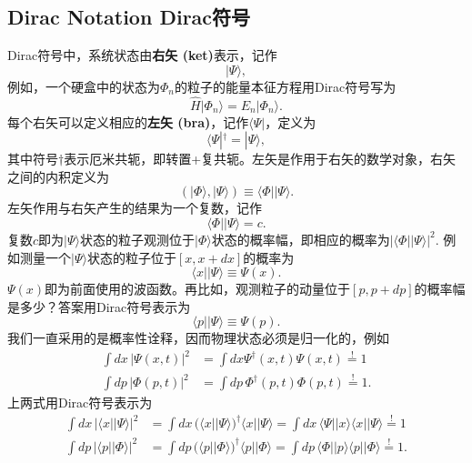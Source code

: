 \subsection[Dirac符号]{Dirac Notation \quad Dirac符号}\label{sec8.5.3}
Dirac符号中，系统状态由{\bf 右矢 (ket)}表示，记作
\begin{equation}
\label{equ8.34}
	|\Psi \rangle,
\end{equation}
例如，一个硬盒中的状态为$\Phi_n$的粒子的能量本征方程用Dirac符号写为
\[
	\hat{H} |\Phi_n \rangle = E_n |\Phi_n \rangle.
\]
每个右矢可以定义相应的{\bf 左矢 (bra)}，记作$\langle \Psi|$，定义为
\begin{equation}
\label{equ8.35}
	\langle \Psi|^\dag = |\Psi \rangle,
\end{equation}
其中符号$\dag$表示厄米共轭，即转置+复共轭。左矢是作用于右矢的数学对象，右矢之间的内积定义为
\[
	(|\Phi \rangle, |\Psi \rangle) \equiv \langle \Phi | | \Psi \rangle.
\]
左矢作用与右矢产生的结果为一个复数，记作
\begin{equation}
\label{equ8.36}
	\langle \Phi || \Psi \rangle = c.
\end{equation}
复数$c$即为$|\Psi \rangle$状态的粒子观测位于$|\Phi\rangle$状态的概率幅，即相应的概率为$| \langle \Phi || \Psi \rangle |^2$. 例如测量一个$|\Psi \rangle$状态的粒子位于$[x, x + dx]$的概率为
\[
	\langle x | | \Psi \rangle \equiv \Psi(x).
\]
$\Psi(x)$即为前面使用的波函数。再比如，观测粒子的动量位于$[p, p + dp]$的概率幅是多少？答案用Dirac符号表示为
\[
	\langle p || \Psi \rangle \equiv \Psi(p).
\]
我们一直采用的是概率性诠释，因而物理状态必须是归一化的，例如
\begin{align}
\label{equ8.37}
	\int dx\, |\Psi(x, t)|^2 &= \int dx \Psi^\dag(x, t) \Psi(x, t) \stackrel{!}{=} 1 \\
\label{equ8.38}
	\int dp\, |\Phi (p, t)|^2 &= \int dp\, \Phi^\dag (p, t) \Phi(p, t) \stackrel{!}{=} 1.
\end{align}
上两式用Dirac符号表示为
\begin{align}
\label{equ8.39}
	\int dx\, | \langle x||\Psi \rangle|^2 &= \int dx\, \big( \langle x||\Psi \rangle \big)^\dag \langle x|| \Psi \rangle = \int dx\, \langle \Psi || x \rangle \langle x|| \Psi \rangle \stackrel{!}{=} 1 \\
\label{equ8.40}
	\int dp\, | \langle p||\Phi \rangle|^2 &= \int dp\, \big( \langle p||\Phi \rangle \big)^\dag \langle p|| \Phi \rangle = \int dp\, \langle \Phi || p \rangle \langle p|| \Phi \rangle \stackrel{!}{=} 1.
\end{align}

